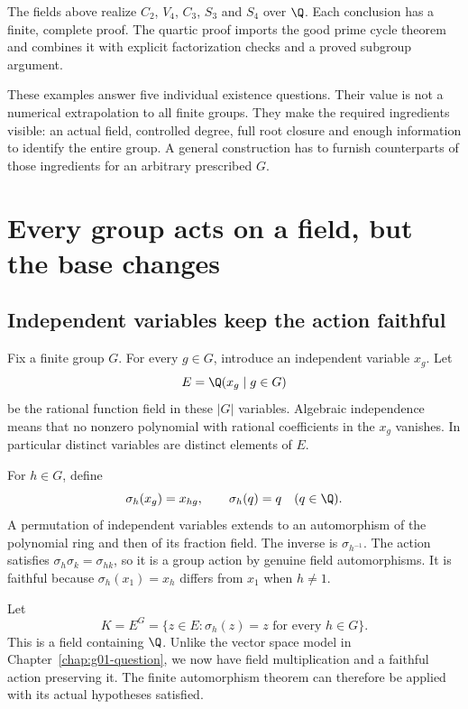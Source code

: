 \begin{resultbox}
The fields above realize $C_2$, $V_4$, $C_3$, $S_3$ and $S_4$ over $\Q$. Each conclusion has a finite, complete proof. The quartic proof imports the good prime cycle theorem and combines it with explicit factorization checks and a proved subgroup argument.
\end{resultbox}

These examples answer five individual existence questions. Their value is not a numerical extrapolation to all finite groups. They make the required ingredients visible: an actual field, controlled degree, full root closure and enough information to identify the entire group. A general construction has to furnish counterparts of those ingredients for an arbitrary prescribed $G$.

\chapter{Every group acts on a field, but the base changes}
\label{chap:g03-generic}

\section{Independent variables keep the action faithful}

Fix a finite group $G$. For every $g\in G$, introduce an independent variable $x_g$. Let
\[
E=\Q(x_g\mid g\in G)
\]
be the rational function field in these $|G|$ variables. Algebraic independence means that no nonzero polynomial with rational coefficients in the $x_g$ vanishes. In particular distinct variables are distinct elements of $E$.

For $h\in G$, define
\begin{equation}
\label{eq:g03-variable-action}
\sigma_h(x_g)=x_{hg},\qquad\sigma_h(q)=q\quad(q\in\Q).
\end{equation}
A permutation of independent variables extends to an automorphism of the polynomial ring and then of its fraction field. The inverse is $\sigma_{h^{-1}}$. The action satisfies $\sigma_h\sigma_k=\sigma_{hk}$, so it is a group action by genuine field automorphisms. It is faithful because $\sigma_h(x_1)=x_h$ differs from $x_1$ when $h\ne1$.

Let
\[
K=E^G=\{z\in E:\sigma_h(z)=z\text{ for every }h\in G\}.
\]
This is a field containing $\Q$. Unlike the vector space model in Chapter~\ref{chap:g01-question}, we now have field multiplication and a faithful action preserving it. The finite automorphism theorem can therefore be applied with its actual hypotheses satisfied.

